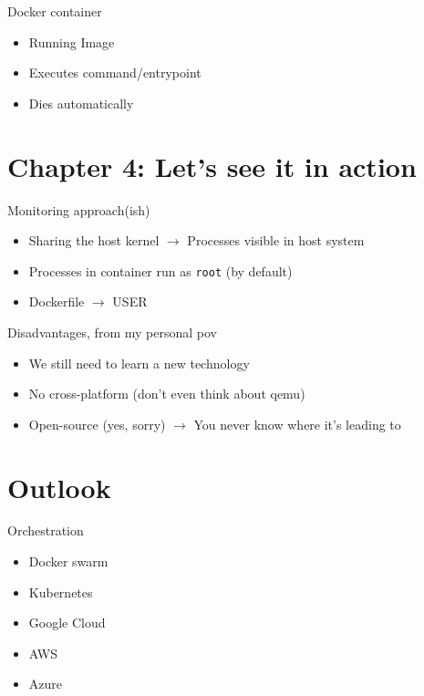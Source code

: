 \documentclass[aspectratio=169]{beamer}
\begin{document}
	\begin{frame}{Docker container}
		\begin{itemize}
			\item Running Image
			\item Executes command/entrypoint
			\item Dies automatically
		\end{itemize}
	\end{frame}

	\section{Chapter 4: Let's see it in action}


	\begin{frame}{Monitoring approach(ish)}
		\begin{itemize}
			\item Sharing the host kernel $\rightarrow$ Processes visible in host system
			\item Processes in container run as \texttt{root} (by default)
			\item Dockerfile $\rightarrow$ USER
		\end{itemize}
	\end{frame}

	\begin{frame}{Disadvantages, from my personal pov}
		\begin{itemize}
			\item We still need to learn a new technology
			\item No cross-platform (don't even think about qemu)
			\item Open-source (yes, sorry) $\rightarrow$ You never know where it's leading to
		\end{itemize}
	\end{frame}

	\section{Outlook}
	\begin{frame}{Orchestration}
		\begin{itemize}
			\item Docker swarm
			\item Kubernetes
			\item Google Cloud
			\item AWS
			\item Azure
		\end{itemize}
	\end{frame}
\end{document}

